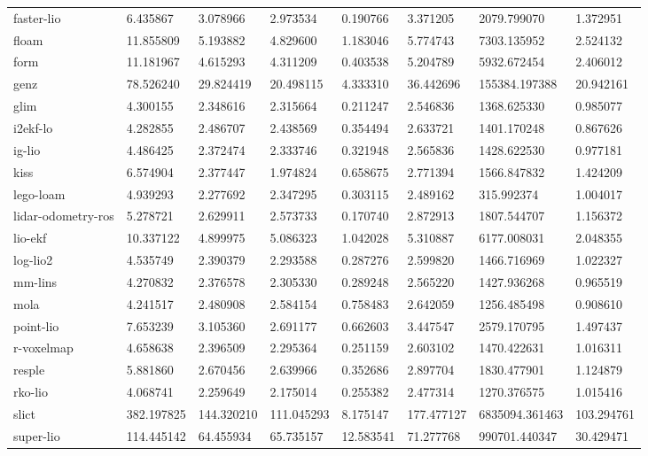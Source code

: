 \begin{table}[]
{\begin{tabular}{llllllll}
		faster-lio & 6.435867 & 3.078966 & 2.973534 & 0.190766 & 3.371205 & 2079.799070 & 1.372951 \\
		floam & 11.855809 & 5.193882 & 4.829600 & 1.183046 & 5.774743 & 7303.135952 & 2.524132 \\
		form & 11.181967 & 4.615293 & 4.311209 & 0.403538 & 5.204789 & 5932.672454 & 2.406012 \\
		genz & 78.526240 & 29.824419 & 20.498115 & 4.333310 & 36.442696 & 155384.197388 & 20.942161 \\
		glim & 4.300155 & 2.348616 & 2.315664 & 0.211247 & 2.546836 & 1368.625330 & 0.985077 \\
		i2ekf-lo & 4.282855 & 2.486707 & 2.438569 & 0.354494 & 2.633721 & 1401.170248 & 0.867626 \\
		ig-lio & 4.486425 & 2.372474 & 2.333746 & 0.321948 & 2.565836 & 1428.622530 & 0.977181 \\
		kiss & 6.574904 & 2.377447 & 1.974824 & 0.658675 & 2.771394 & 1566.847832 & 1.424209 \\
		lego-loam & 4.939293 & 2.277692 & 2.347295 & 0.303115 & 2.489162 & 315.992374 & 1.004017 \\
		lidar-odometry-ros & 5.278721 & 2.629911 & 2.573733 & 0.170740 & 2.872913 & 1807.544707 & 1.156372 \\
		lio-ekf & 10.337122 & 4.899975 & 5.086323 & 1.042028 & 5.310887 & 6177.008031 & 2.048355 \\
		log-lio2 & 4.535749 & 2.390379 & 2.293588 & 0.287276 & 2.599820 & 1466.716969 & 1.022327 \\
		mm-lins & 4.270832 & 2.376578 & 2.305330 & 0.289248 & 2.565220 & 1427.936268 & 0.965519 \\
		mola & 4.241517 & 2.480908 & 2.584154 & 0.758483 & 2.642059 & 1256.485498 & 0.908610 \\
		point-lio & 7.653239 & 3.105360 & 2.691177 & 0.662603 & 3.447547 & 2579.170795 & 1.497437 \\
		r-voxelmap & 4.658638 & 2.396509 & 2.295364 & 0.251159 & 2.603102 & 1470.422631 & 1.016311 \\
		resple & 5.881860 & 2.670456 & 2.639966 & 0.352686 & 2.897704 & 1830.477901 & 1.124879 \\
		rko-lio & 4.068741 & 2.259649 & 2.175014 & 0.255382 & 2.477314 & 1270.376575 & 1.015416 \\
		slict & 382.197825 & 144.320210 & 111.045293 & 8.175147 & 177.477127 & 6835094.361463 & 103.294761 \\
		super-lio & 114.445142 & 64.455934 & 65.735157 & 12.583541 & 71.277768 & 990701.440347 & 30.429471 \\

\end{tabular}}
\end{table}
